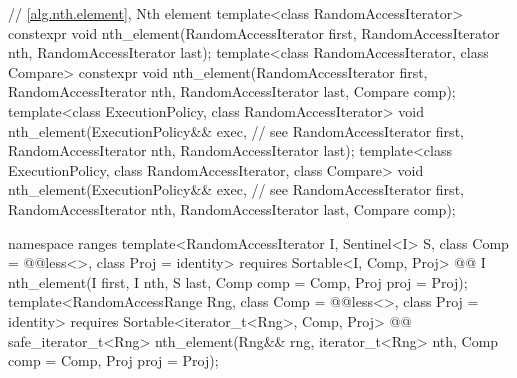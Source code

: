 \begin{codeblock}
  // \ref{alg.nth.element}, Nth element
  template<class RandomAccessIterator>
    constexpr void nth_element(RandomAccessIterator first, RandomAccessIterator nth,
                               RandomAccessIterator last);
  template<class RandomAccessIterator, class Compare>
    constexpr void nth_element(RandomAccessIterator first, RandomAccessIterator nth,
                               RandomAccessIterator last, Compare comp);
  template<class ExecutionPolicy, class RandomAccessIterator>
    void nth_element(ExecutionPolicy&& exec, // see 
                     RandomAccessIterator first, RandomAccessIterator nth,
                     RandomAccessIterator last);
  template<class ExecutionPolicy, class RandomAccessIterator, class Compare>
    void nth_element(ExecutionPolicy&& exec, // see 
                     RandomAccessIterator first, RandomAccessIterator nth,
                     RandomAccessIterator last, Compare comp);
\end{codeblock}\begin{addedblock}\begin{codeblock}
  namespace ranges {
    template<RandomAccessIterator I, Sentinel<I> S, class Comp = @@less<>,
        class Proj = identity>
      requires Sortable<I, Comp, Proj>
      @@ I
        nth_element(I first, I nth, S last, Comp comp = Comp{}, Proj proj = Proj{});
    template<RandomAccessRange Rng, class Comp = @@less<>, class Proj = identity>
      requires Sortable<iterator_t<Rng>, Comp, Proj>
      @@ safe_iterator_t<Rng>
        nth_element(Rng&& rng, iterator_t<Rng> nth, Comp comp = Comp{}, Proj proj = Proj{});
  }
\end{codeblock}\end{addedblock}\begin{codeblock}


\end{codeblock}
